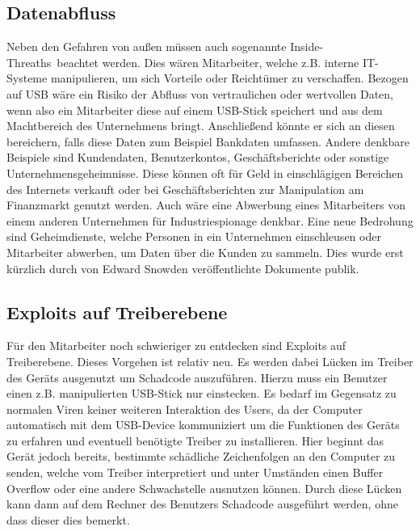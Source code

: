 \subsection{Datenabfluss}
Neben den Gefahren von außen müssen auch sogenannte \glqq Inside-Threaths\grqq \ beachtet werden. Dies wären Mitarbeiter, welche z.B. interne IT-Systeme manipulieren, um sich Vorteile oder Reichtümer zu verschaffen. Bezogen auf USB wäre ein Risiko der Abfluss von vertraulichen oder wertvollen Daten, wenn also ein Mitarbeiter diese auf einem USB-Stick speichert und aus dem Machtbereich des Unternehmens bringt. Anschließend könnte er sich an diesen bereichern, falls diese Daten zum Beispiel Bankdaten umfassen. Andere denkbare Beispiele sind Kundendaten, Benutzerkontos, Geschäftsberichte oder sonstige Unternehmensgeheimnisse. Diese können oft für Geld in einschlägigen Bereichen des Internets verkauft oder bei Geschäftsberichten zur Manipulation am Finanzmarkt genutzt werden. Auch wäre eine Abwerbung eines Mitarbeiters von einem anderen Unternehmen für Industriespionage denkbar.
Eine neue Bedrohung sind Geheimdienste, welche Personen in ein Unternehmen einschleusen oder Mitarbeiter abwerben, um Daten über die Kunden zu sammeln. Dies wurde erst kürzlich durch von Edward Snowden veröffentlichte Dokumente publik.\cite{Snowden2}

\subsection{Exploits auf Treiberebene}
Für den Mitarbeiter noch schwieriger zu entdecken sind Exploits auf Treiberebene. Dieses Vorgehen ist relativ neu. Es werden dabei Lücken im Treiber des Geräts ausgenutzt um Schadcode auszuführen. Hierzu muss ein Benutzer einen z.B. manipulierten USB-Stick nur einstecken. Es bedarf im Gegensatz zu normalen Viren keiner weiteren Interaktion des Users, da der Computer automatisch mit dem USB-Device kommuniziert um die Funktionen des Geräts zu erfahren und eventuell benötigte Treiber zu installieren. Hier beginnt das Gerät jedoch bereits, bestimmte schädliche Zeichenfolgen an den  Computer zu senden, welche vom Treiber interpretiert und unter Umständen einen Buffer Overflow  oder eine andere Schwachstelle ausnutzen können\cite{BadUSB}. Durch diese Lücken kann dann auf dem Rechner des Benutzers Schadcode ausgeführt werden, ohne dass dieser dies bemerkt.


